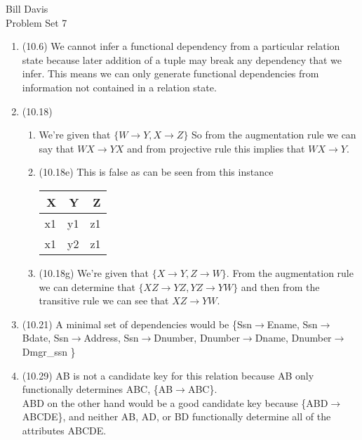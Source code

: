 \documentclass[11pt,fleqn]{article}
\begin{document}
\noindent Bill Davis \\
 Problem Set 7

\begin{enumerate}
\item (10.6) %
We cannot infer a functional dependency from a particular relation state because later addition of a tuple may break any dependency that we infer. This means we can only generate functional dependencies from information not contained in a relation state. 

\item (10.18)
\begin{enumerate}
\item 
We're given that
$\{W \rightarrow Y, X \rightarrow Z\}  \nonumber  $ So from the augmentation rule we can say that $WX \rightarrow YX$ and from projective rule this implies that $WX \rightarrow Y $.

\item (10.18e) This is false as can be seen from this instance
\begin{tabular}{|r|r|r|}
  \hline
X&Y&Z\\
  \hline
x1 & y1 & z1 \\
x1 & y2 & z1 \\
  \hline
\end{tabular}
\item (10.18g) We're given that $\{ X \rightarrow Y , Z \rightarrow W\}$. From the augmentation rule we can determine that $\{ XZ \rightarrow YZ, YZ \rightarrow YW  \}$ and then from the transitive rule we can see that $XZ\rightarrow YW$.


\end{enumerate}

\item  (10.21) A minimal set of dependencies would be \{Ssn$\rightarrow$Ename, Ssn$\rightarrow$Bdate, Ssn$\rightarrow$Address, Ssn$\rightarrow$Dnumber, Dnumber$\rightarrow$Dname, Dnumber$\rightarrow$Dmgr\_ssn  \} 

\item(10.29) AB is not a candidate key for this relation because AB only functionally determines ABC, \{AB$\rightarrow$ABC\}. \\
ABD on the other hand would be a good candidate key because \{ABD$\rightarrow$ABCDE\}, and neither AB, AD, or BD functionally determine all of the attributes ABCDE. 
\end{enumerate}
\end{document}
